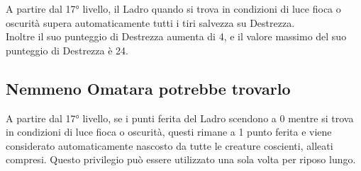 A partire dal 17° livello, il Ladro quando si trova in condizioni di luce fioca o oscurità supera automaticamente tutti i tiri salvezza su Destrezza. \\ Inoltre il suo punteggio di Destrezza aumenta di 4, e il valore massimo del suo punteggio di Destrezza è 24.

\subsection{Nemmeno Omatara potrebbe trovarlo}

A partire dal 17° livello, se i punti ferita del Ladro scendono a 0 mentre si trova in condizioni di luce fioca o oscurità, questi rimane a 1 punto ferita e viene considerato automaticamente nascosto da tutte le creature coscienti, alleati compresi. Questo privilegio può essere utilizzato una sola volta per riposo lungo.
